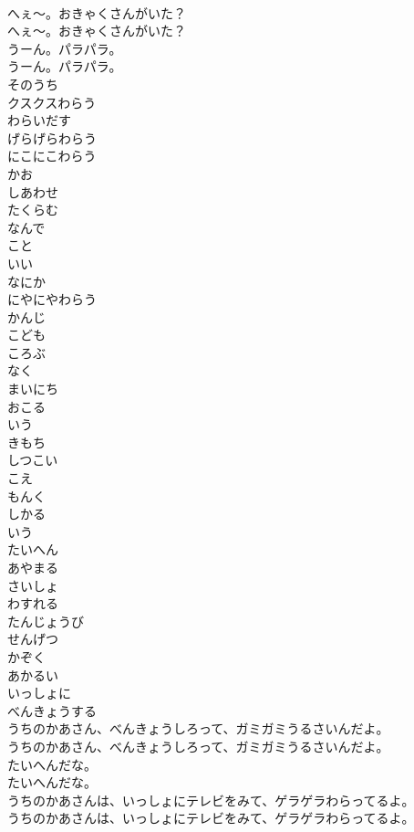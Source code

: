 \documentclass[8pt]{extreport}
\begin{document}
\begin{CJK}{UTF8}{min}
\\	へぇ～。おきゃくさんがいた？
\\	へぇ～。おきゃくさんがいた？
\\	うーん。パラパラ。
\\	うーん。パラパラ。
\\	そのうち
\\	クスクスわらう
\\	わらいだす
\\	げらげらわらう
\\	にこにこわらう
\\	かお
\\	しあわせ
\\	たくらむ
\\	なんで
\\	こと
\\	いい
\\	なにか
\\	にやにやわらう
\\	かんじ
\\	こども
\\	ころぶ
\\	なく
\\	まいにち
\\	おこる
\\	いう
\\	きもち
\\	しつこい
\\	こえ
\\	もんく
\\	しかる
\\	いう
\\	たいへん
\\	あやまる
\\	さいしょ
\\	わすれる
\\	たんじょうび
\\	せんげつ
\\	かぞく
\\	あかるい
\\	いっしょに
\\	べんきょうする
\\	うちのかあさん、べんきょうしろって、ガミガミうるさいんだよ。
\\	うちのかあさん、べんきょうしろって、ガミガミうるさいんだよ。
\\	たいへんだな。
\\	たいへんだな。
\\	うちのかあさんは、いっしょにテレビをみて、ゲラゲラわらってるよ。
\\	うちのかあさんは、いっしょにテレビをみて、ゲラゲラわらってるよ。

\end{CJK}
\end{document}
